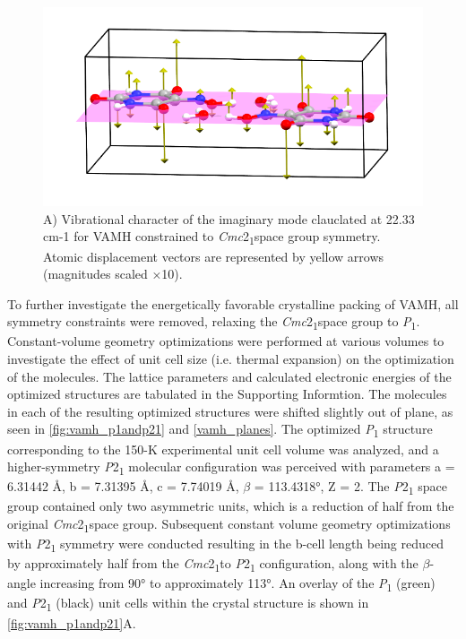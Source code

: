 \begin{figure}[ht]
  \center
  \includegraphics[width=1\linewidth]{src/figures/VAMH_figures/VAMH_fig3.png}
  \caption{A) Vibrational character of the imaginary mode clauclated at 22.33 cm-1 for VAMH constrained to \textit{Cmc}2\textsubscript{1}space group symmetry. Atomic displacement vectors are represented by yellow arrows (magnitudes scaled ×10). }
  \label{fig:vamh_imaginarymode}
\end{figure}

To further investigate the energetically favorable crystalline packing of VAMH, all symmetry constraints were removed, relaxing the \textit{Cmc}2\textsubscript{1}space group to \textit{P}\textsubscript{1}. Constant-volume geometry optimizations were performed at various volumes to investigate the effect of unit cell size (i.e. thermal expansion) on the optimization of the molecules. The lattice parameters and calculated electronic energies of the optimized structures are tabulated in the Supporting Informtion. The molecules in each of the resulting optimized structures were shifted slightly out of plane, as seen in \autoref{fig:vamh_p1andp21} and \autoref{vamh_planes}.  The optimized \textit{P}\textsubscript{1} structure corresponding to the 150-K experimental unit cell volume was analyzed, and a higher-symmetry \textit{P}2\textsubscript{1} molecular configuration was perceived with parameters a = 6.31442 Å, b = 7.31395 Å, c = 7.74019 Å, \(\beta\) = 113.4318°, Z = 2. The \textit{P}2\textsubscript{1} space group contained only two asymmetric units, which is a reduction of half from the original \textit{Cmc}2\textsubscript{1}space group. Subsequent constant volume geometry optimizations with \textit{P}2\textsubscript{1} symmetry were conducted resulting in the b-cell length being reduced by approximately half from the \textit{Cmc}2\textsubscript{1}to \textit{P}2\textsubscript{1} configuration, along with the \(\beta\)-angle increasing from 90° to approximately 113°. An overlay of the \textit{P}\textsubscript{1} (green) and \textit{P}2\textsubscript{1} (black) unit cells within the crystal structure is shown in \autoref{fig:vamh_p1andp21}A. 

